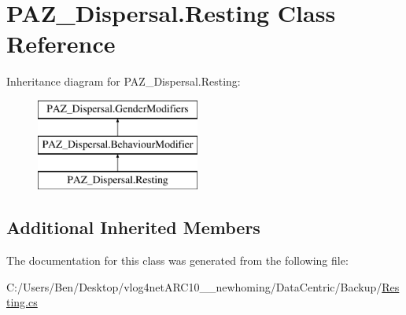 \hypertarget{class_p_a_z___dispersal_1_1_resting}{\section{P\-A\-Z\-\_\-\-Dispersal.\-Resting Class Reference}
\label{class_p_a_z___dispersal_1_1_resting}
}
Inheritance diagram for P\-A\-Z\-\_\-\-Dispersal.\-Resting\-:\begin{figure}[H]
\begin{center}
\leavevmode
\includegraphics[height=3.000000cm]{class_p_a_z___dispersal_1_1_resting}
\end{center}
\end{figure}
\subsection*{Additional Inherited Members}


The documentation for this class was generated from the following file\-:\begin{DoxyCompactItemize}
\item 
C\-:/\-Users/\-Ben/\-Desktop/vlog4net\-A\-R\-C10\-\_\-\_\-newhoming/\-Data\-Centric/\-Backup/\hyperlink{_backup_2_resting_8cs}{Resting.\-cs}\end{DoxyCompactItemize}
